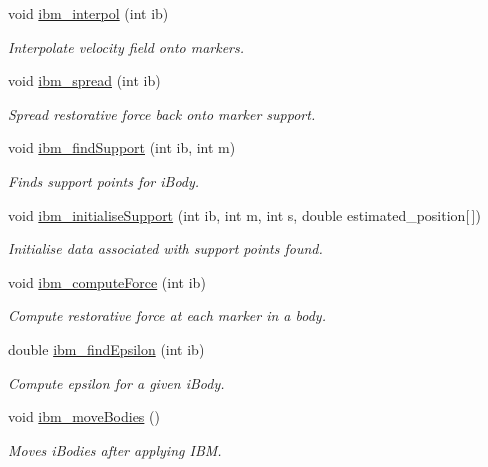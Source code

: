 \begin{DoxyCompactItemize}
void \hyperlink{class_object_manager_aff31915ad0effdcc8dc18f602ddd1c20}{ibm\+\_\+interpol} (int ib)
\begin{DoxyCompactList}\small\item\em Interpolate velocity field onto markers. \end{DoxyCompactList}\item 
void \hyperlink{class_object_manager_a8096f9ec97cf7ce2fc45ebfcbdf3617e}{ibm\+\_\+spread} (int ib)
\begin{DoxyCompactList}\small\item\em Spread restorative force back onto marker support. \end{DoxyCompactList}\item 
void \hyperlink{class_object_manager_ac5e71323491a8c3f38fecc51d1530a04}{ibm\+\_\+find\+Support} (int ib, int m)
\begin{DoxyCompactList}\small\item\em Finds support points for i\+Body. \end{DoxyCompactList}\item 
void \hyperlink{class_object_manager_a45943d344a20ac8f4c2349de28c1ace6}{ibm\+\_\+initialise\+Support} (int ib, int m, int s, double estimated\+\_\+position\mbox{[}$\,$\mbox{]})
\begin{DoxyCompactList}\small\item\em Initialise data associated with support points found. \end{DoxyCompactList}\item 
void \hyperlink{class_object_manager_ada21b4ed1a05af704597fce572142df8}{ibm\+\_\+compute\+Force} (int ib)
\begin{DoxyCompactList}\small\item\em Compute restorative force at each marker in a body. \end{DoxyCompactList}\item 
double \hyperlink{class_object_manager_a0538f952cf2d548ff89a3ce058fc1649}{ibm\+\_\+find\+Epsilon} (int ib)
\begin{DoxyCompactList}\small\item\em Compute epsilon for a given i\+Body. \end{DoxyCompactList}\item 
void \hyperlink{class_object_manager_ab93cad4c08e96444eec3278dff84665e}{ibm\+\_\+move\+Bodies} ()
\begin{DoxyCompactList}\small\item\em Moves i\+Bodies after applying I\+BM. \end{DoxyCompactList}\item 

\end{DoxyCompactItemize}
